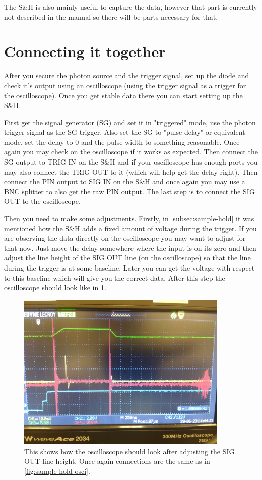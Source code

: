 \documentclass[a4paper, 10pt]{article}
\begin{document}
The S\&H is also mainly useful to capture the data, however that part is currently not described in the manual so there will be parts necessary for that.

\section{Connecting it together}
After you secure the photon source and the trigger signal, set up the diode and check it's output using an oscilloscope (using the trigger signal as a trigger for the oscilloscope).
Once you get stable data there you can start setting up the S\&H.

First get the signal generator (SG) and set it in "triggered" mode, use the photon trigger signal as the SG trigger.
Also set the SG to "pulse delay" or equivalent mode, set the delay to 0 and the pulse width to something reasonable.
Once again you may check on the oscilloscope if it works as expected.
Then connect the SG output to TRIG IN on the S\&H and if your oscilloscope has enough ports you may also connect the TRIG OUT to it (which will help get the delay right).
Then connect the PIN output to SIG IN on the S\&H and once again you may use a BNC splitter to also get the raw PIN output.
The last step is to connect the SIG OUT to the oscilloscope.

Then you need to make some adjustments.
Firstly, in \cref{subsec:sample-hold} it was mentioned how the S\&H adds a fixed amount of voltage during the trigger.
If you are observing the data directly on the oscilloscope you may want to adjust for that now.
Just move the delay somewhere where the input is on its zero and then adjust the line height of the SIG OUT line (on the oscilloscope) so that the line during the trigger is at some baseline.
Later you can get the voltage with respect to this baseline which will give you the correct data.
After this step the oscilloscope should look like in \cref{fig:config-height-adjust}.

\begin{figure}[H]
    \centering
    \includegraphics[width=0.9\textwidth]{../images/config-height-adjust.jpg}
    \caption{This shows how the oscilloscope should look after adjusting the SIG OUT line height. Once again connections are the same as in \cref{fig:sample-hold-osci}.}
    \label{fig:config-height-adjust}
\end{figure}
\end{document}
